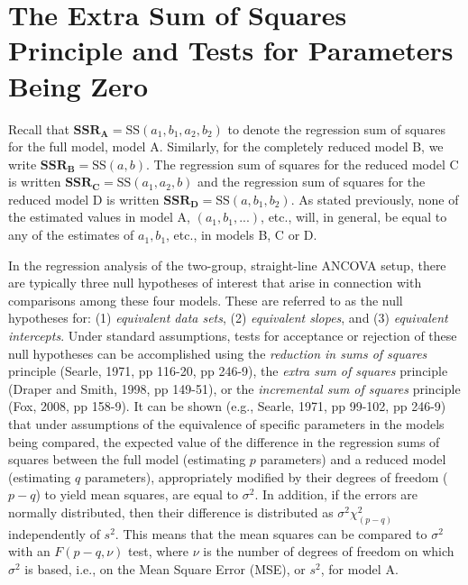 \documentclass[11pt, oneside]{article}   	%
\begin{document}
\bigskip


\section{The Extra Sum of Squares Principle and Tests for Parameters Being Zero}

Recall that $ \mathbf{SSR_{A}} = \mbox{SS} (a_{1}, b_{1}, a_{2}, b_{2})  $ to denote the regression sum of squares for the full model, model A.  Similarly, for the completely reduced model B, we write $ \mathbf{SSR_{B}} = \mbox{SS} (a, b) $.  The regression sum of squares for the reduced model C is written $ \mathbf{SSR_{C}} = \mbox{SS} (a_{1}, a_{2}, b) $ and the regression sum of squares for the reduced model D is written $ \mathbf{SSR_{D}} = \mbox{SS} (a, b_{1}, b_{2})  $. As stated previously, none of the estimated values in model A, $  (a_{1}, b_{1}, ...)   $, etc., will, in general, be equal to any of the estimates of $ a_{1}, b_{1}  $, etc., in models B, C or D.  

\vspace{2 mm}

In the regression analysis of the two-group, straight-line ANCOVA setup, there are typically three null hypotheses of interest that arise in connection with comparisons among these four models.  These are referred to as the null hypotheses for: (1) \emph{equivalent data sets}, (2) \emph{equivalent slopes}, and (3) \emph{equivalent intercepts}.  Under standard assumptions, tests for acceptance or rejection of these null hypotheses can be accomplished using the \emph{reduction in sums of squares} principle (Searle, 1971, pp 116-20, pp 246-9), the \emph{extra sum of squares} principle (Draper and Smith, 1998, pp 149-51), or the \emph{incremental sum of squares} principle (Fox, 2008, pp 158-9).  It can be shown (e.g., Searle, 1971, pp 99-102, pp 246-9) that under assumptions of the equivalence of specific parameters in the models being compared, the expected value of the difference in the regression sums of squares between the full model (estimating $ p $ parameters) and a reduced model (estimating $ q $ parameters), appropriately modified by their degrees of freedom ($ p - q $) to yield mean squares, are equal to $ \sigma^{2} $.  In addition, if the errors are normally distributed, then their difference is distributed as  $ \sigma^{2} \chi^{2}_{(p-q)}  $ independently of $ s^{2}  $.  This means that the mean squares can be compared to $ \sigma^{2} $ with an $ F (p-q, \nu) $ test, where $ \nu $ is the number of degrees of freedom on which $ \sigma^{2} $ is based, i.e., on the Mean Square Error (MSE), or $ s^{2} $, for model A.    
\end{document}
